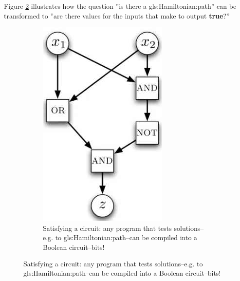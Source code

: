 \documentclass[]{article}
\begin{document}
Figure \ref{fig:satisfying} illustrates how the question ''is there a \gls{gls:Hamiltonian:path}'' can be transformed to ''are there values for the inputs that make to output \textbf{true}?''
\begin{figure}[H]
	\begin{center}
		\caption{Satisfying a circuit}
		\begin{subfigure}[b]{0.45\textwidth}
			\caption{Satisfying a circuit: any program that tests solutions--e.g. to \gls{gls:Hamiltonian:path}--can be compiled into a Boolean circuit--bits!}\label{fig:satisfying}
			\includegraphics[width=\textwidth]{satisfy}
		\end{subfigure}

\end{center}
\end{figure}
\end{document}
